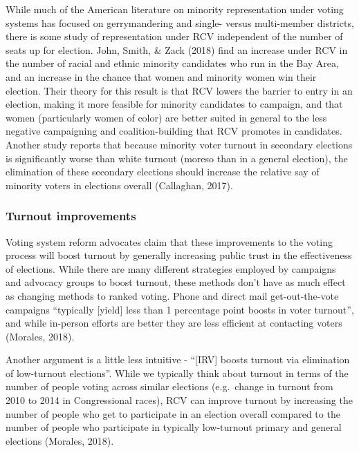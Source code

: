 \documentclass[12pt,twoside]{reedthesis}
\begin{document}
While much of the American literature on minority representation under voting systems has focused on gerrymandering and single- versus multi-member districts, there is some study of representation under RCV independent of the number of seats up for election. John, Smith, \& Zack (2018) find an increase under RCV in the number of racial and ethnic minority candidates who run in the Bay Area, and an increase in the chance that women and minority women win their election. Their theory for this result is that RCV lowers the barrier to entry in an election, making it more feasible for minority candidates to campaign, and that women (particularly women of color) are better suited in general to the less negative campaigning and coalition-building that RCV promotes in candidates. Another study reports that because minority voter turnout in secondary elections is significantly worse than white turnout (moreso than in a general election), the elimination of these secondary elections should increase the relative say of minority voters in elections overall (Callaghan, 2017).

\hypertarget{turnout-improvements}{%
\subsubsection{Turnout improvements}\label{turnout-improvements}}

Voting system reform advocates claim that these improvements to the voting process will boost turnout by generally increasing public trust in the effectiveness of elections. While there are many different strategies employed by campaigns and advocacy groups to boost turnout, these methods don't have as much effect as changing methods to ranked voting. Phone and direct mail get-out-the-vote campaigns ``typically {[}yield{]} less than 1 percentage point boosts in voter turnout'', and while in-person efforts are better they are less efficient at contacting voters (Morales, 2018).

Another argument is a little less intuitive - ``{[}IRV{]} boosts turnout via elimination of low-turnout elections''. While we typically think about turnout in terms of the number of people voting across similar elections (e.g.~change in turnout from 2010 to 2014 in Congressional races), RCV can improve turnout by increasing the number of people who get to participate in an election overall compared to the number of people who participate in typically low-turnout primary and general elections (Morales, 2018).
\end{document}
